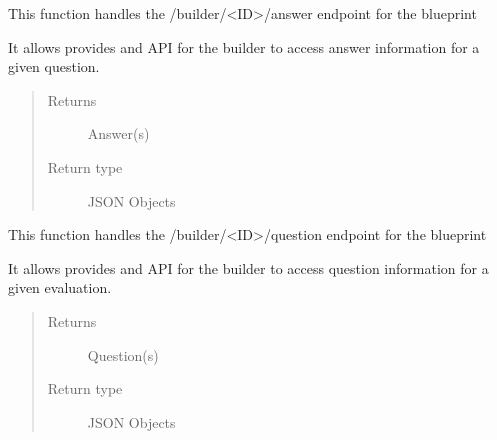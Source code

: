 \documentclass[letterpaper,10pt,english]{sphinxmanual}
\begin{document}

\begin{fulllineitems}
\label{dev-evaluations:cagenix.evaluations.views.evaluations_create_answer}
This function handles the /builder/\textless{}ID\textgreater{}/answer endpoint for the blueprint

It allows provides and API for the builder to access answer information for a given
question.
\begin{quote}\begin{description}
\item[{Returns}] \leavevmode
Answer(s)

\item[{Return type}] \leavevmode
JSON Objects

\end{description}\end{quote}

\end{fulllineitems}


\begin{fulllineitems}
\label{dev-evaluations:cagenix.evaluations.views.evaluations_create_questions}
This function handles the /builder/\textless{}ID\textgreater{}/question endpoint for the blueprint

It allows provides and API for the builder to access question information for a given
evaluation.
\begin{quote}\begin{description}
\item[{Returns}] \leavevmode
Question(s)

\item[{Return type}] \leavevmode
JSON Objects

\end{description}\end{quote}

\end{fulllineitems}

\end{document}
